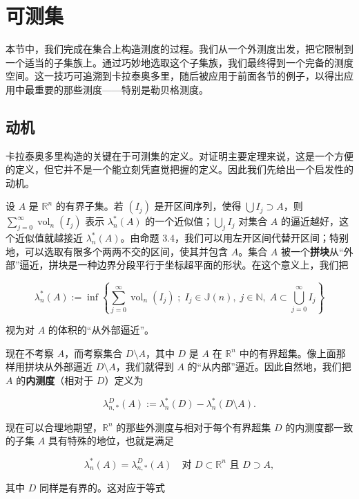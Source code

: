 \section{可测集}

本节中，我们完成在集合上构造测度的过程。我们从一个外测度出发，把它限制到一个适当的子集族上。通过巧妙地选取这个子集族，我们最终得到一个完备的测度空间。这一技巧可追溯到卡拉泰奥多里，随后被应用于前面各节的例子，以得出应用中最重要的那些测度——特别是勒贝格测度。

\subsection*{动机}

卡拉泰奥多里构造的关键在于可测集的定义。对证明主要定理来说，这是一个方便的定义，但它并不是一个能立刻凭直觉把握的定义。因此我们先给出一个启发性的动机。

设 $ A $ 是 $ \mathbb{R}^n $ 的有界子集。若 $ (I_j) $ 是开区间序列，使得 $ \bigcup I_j \supset A $，则 $ \sum_{j=0}^{\infty} \operatorname{vol}_n(I_j) $ 表示 $ \lambda_n^*(A) $ 的一个近似值；$ \bigcup_j I_j $ 对集合 $ A $ 的逼近越好，这个近似值就越接近 $ \lambda_n^*(A) $。由命题 3.4，我们可以用左开区间代替开区间；特别地，可以选取有限多个两两不交的区间，使其并包含 $ A $。集合 $ A $ 被一个\textbf{拼块}从“外部”逼近，拼块是一种边界分段平行于坐标超平面的形状。在这个意义上，我们把

\[
\lambda_n^*(A) := \inf\left\{ \sum_{j=0}^{\infty} \operatorname{vol}_n(I_j) \; ; \; I_j \in \mathbb{J}(n),\; j \in \mathbb{N},\; A \subset \bigcup_{j=0}^{\infty} I_j \right\}
\]

视为对 $ A $ 的体积的“从外部逼近”。

现在不考察 $ A $，而考察集合 $ D \setminus A $，其中 $ D $ 是 $ A $ 在 $ \mathbb{R}^n $ 中的有界超集。像上面那样用拼块从外部逼近 $ D \setminus A $，我们就得到 $ A $ 的“从内部”逼近。因此自然地，我们把 $ A $ 的\textbf{内测度}（相对于 $ D $）定义为

\[
\lambda_{n,*}^{D}(A) := \lambda_n^*(D) - \lambda_n^*(D \setminus A) .
\]

现在可以合理地期望，$ \mathbb{R}^n $ 的那些外测度与相对于每个有界超集 $ D $ 的内测度都一致的子集 $ A $ 具有特殊的地位，也就是满足

\[
\lambda_n^*(A) = \lambda_{n,*}^{D}(A) \quad\text{对 } D \subset \mathbb{R}^n \text{ 且 } D \supset A ,
\]

其中 $ D $ 同样是有界的。这对应于等式

